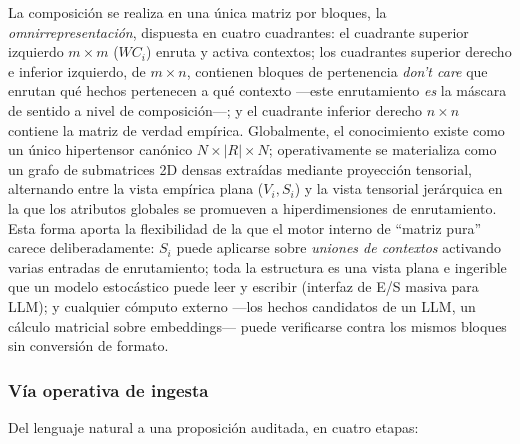 \documentclass{article}
\begin{document}
La composición se realiza en una única matriz por bloques, la
\emph{omnirrepresentación}, dispuesta en cuatro cuadrantes: el cuadrante
superior izquierdo \(m \times m\) (\(WC_i\)) enruta y activa contextos;
los cuadrantes superior derecho e inferior izquierdo, de \(m \times n\),
contienen bloques de pertenencia \emph{don't care} que enrutan qué
hechos pertenecen a qué contexto ---este enrutamiento \emph{es} la
máscara de sentido a nivel de composición---; y el cuadrante inferior
derecho \(n \times n\) contiene la matriz de verdad empírica.
Globalmente, el conocimiento existe como un único hipertensor canónico
\(N \times |R| \times N\); operativamente se materializa como un grafo
de submatrices 2D densas extraídas mediante proyección tensorial,
alternando entre la vista empírica plana (\(V_i, S_i\)) y la vista
tensorial jerárquica en la que los atributos globales se promueven a
hiperdimensiones de enrutamiento. Esta forma aporta la flexibilidad de
la que el motor interno de ``matriz pura'' carece deliberadamente:
\(S_i\) puede aplicarse sobre \emph{uniones de contextos} activando
varias entradas de enrutamiento; toda la estructura es una vista plana e
ingerible que un modelo estocástico puede leer y escribir (interfaz de
E/S masiva para LLM); y cualquier cómputo externo ---los hechos
candidatos de un LLM, un cálculo matricial sobre embeddings--- puede
verificarse contra los mismos bloques sin conversión de formato.

\hypertarget{vuxeda-operativa-de-ingesta}{%
\subsubsection{\texorpdfstring{Vía operativa de ingesta
\label{app:ingestion}}{Vía operativa de ingesta }}\label{vuxeda-operativa-de-ingesta}}

Del lenguaje natural a una proposición auditada, en cuatro etapas:
\end{document}
